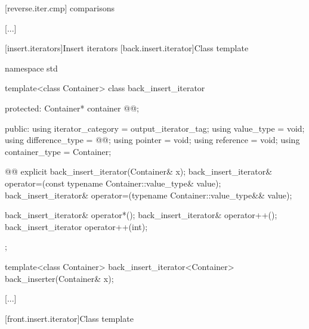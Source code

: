 [reverse.iter.cmp]{ comparisons}

\pnum
{}


[...]


[insert.iterators]{Insert iterators}
[back.insert.iterator]{Class template }


%
\begin{codeblock}
namespace std {
  template<class Container>
  class back_insert_iterator {
  protected:
    Container* container @@;

  public:
    using iterator_category = output_iterator_tag;
    using value_type        = void;
    using difference_type   = @@;
    using pointer           = void;
    using reference         = void;
    using container_type    = Container;

    @@
    explicit back_insert_iterator(Container& x);
    back_insert_iterator& operator=(const typename Container::value_type& value);
    back_insert_iterator& operator=(typename Container::value_type&& value);

    back_insert_iterator& operator*();
    back_insert_iterator& operator++();
    back_insert_iterator  operator++(int);
  };

  template<class Container>
    back_insert_iterator<Container> back_inserter(Container& x);
}
\end{codeblock}

[...]

[front.insert.iterator]{Class template }


